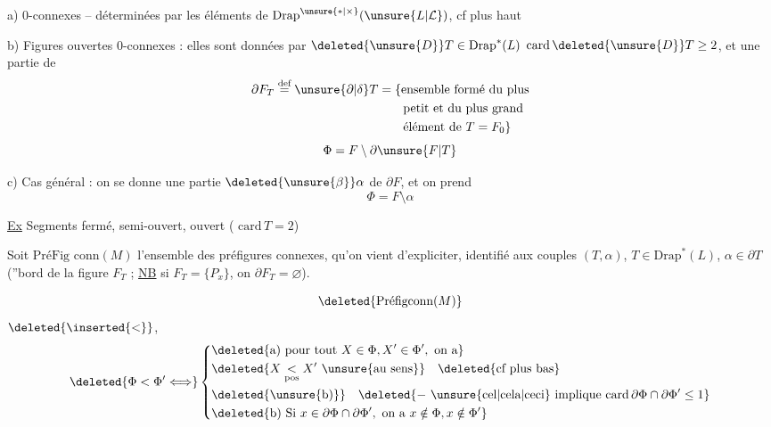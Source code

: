a)  \uline{} $0$-connexes  -- déterminées par les éléments de $\mathrm{Drap}^{\unsure{*|\times}}(\unsure{L|\mathcal L})$, cf plus haut

b) Figures  ouvertes $0$-connexes :  elles sont données par $\deleted{\unsure{D}}T\in\mathrm{Drap}^{*}(L)$ \uline{$\mathrm{card}\,\deleted{\unsure{D}}T\geq 2$}, et une partie de
\[
\begin{aligned}
 \partial F_T\overset{\text{def}}{=}\unsure{\partial|\delta}T
 &=\{\text{ensemble formé du plus}\\
 &\qquad\text{petit et du plus grand}\\
 &\qquad\text{élément de }T=F_0\}
\end{aligned}
\]
\[
 \Phi=F\setminus\partial\unsure{F|T}
\]

c) Cas général : on se donne une partie $\deleted{\unsure{\beta}}\alpha$ de $\partial F$, et on prend
\[
 \Phi=F\setminus\alpha
\]

\uline{Ex} Segments fermé, semi-ouvert, ouvert ( $\mathrm{card}\,T=2$)

Soit $\text{PréFig conn}(M)$ l'ensemble des préfigures connexes, qu'on vient d'expliciter, identifié aux couples $(T,\alpha)$, $T\in\mathrm{Drap}^{*}(L)$, $\alpha\in\partial T$ (''bord de la figure  $F_T$ ; \uline{NB} si $F_T=\{P_x\}$, on   $\partial F_T=\varnothing$).

\[
 \deleted{\text{Préfigconn}(M)}
\]
 $\deleted{\inserted{<}}$, 
\[
 \deleted{\Phi<\Phi'\Longleftrightarrow}
 \left\{\begin{aligned}
 &\deleted{\text{a) pour tout }X\in\Phi,X'\in\Phi',\ \text{on a}}\\
 &\deleted{X\underset{\mathrm{pos}}{<}X'\ \text{\unsure{au sens}}}\quad\deleted{\text{cf plus bas}}\\
 &\deleted{\text{\unsure{b)}}}\quad\deleted{-\ \text{\unsure{cel|cela|ceci} implique }\mathrm{card}\,\partial\Phi\cap\partial\Phi'\leq1}\\
 &\deleted{\text{b) Si }x\in\partial\Phi\cap\partial\Phi',\ \text{on a }x\notin\Phi,x\notin\Phi'}
 \end{aligned}\right.
\]
